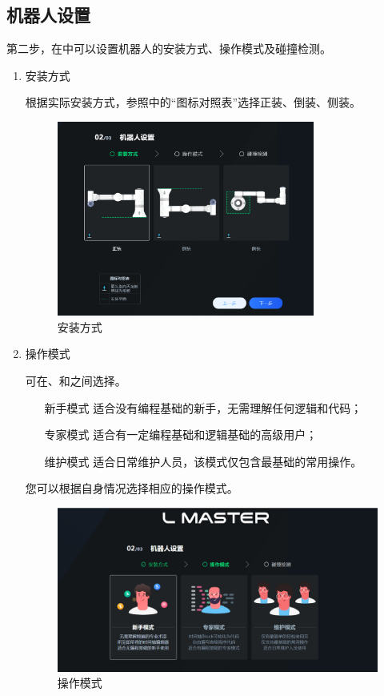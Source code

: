 \subsection{机器人设置}
第二步，在中可以设置机器人的安装方式、操作模式及碰撞检测。
\begin{enumerate}
\item 安装方式

	根据实际安装方式，参照中的“图标对照表”选择正装、倒装、侧装。

	\begin{figure}[ht]
		\centering
		\includegraphics[width=0.8\textwidth]{screen/2-6.png}
		\caption{安装方式}
		\label{fig:安装方式}
	\end{figure}



\item 操作模式

可在、和之间选择。 
\begin{itemize}
\item[新手模式] 适合没有编程基础的新手，无需理解任何逻辑和代码；
\item[专家模式] 适合有一定编程基础和逻辑基础的高级用户；
\item[维护模式] 适合日常维护人员，该模式仅包含最基础的常用操作。
\end{itemize}
您可以根据自身情况选择相应的操作模式。 

	\begin{figure}[ht]
		\centering
		\includegraphics[width=\textwidth]{image/07/图2.7 操作模式.png}
		\caption{操作模式}
		\label{fig:操作模式}
	\end{figure}


\end{enumerate}

